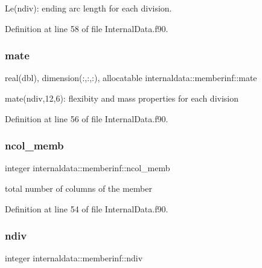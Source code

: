 Le(ndiv)\+: ending arc length for each division. 



Definition at line 58 of file Internal\+Data.\+f90.

\mbox{\label{structinternaldata_1_1memberinf_a992b8e0a6f7e01d33329d4cf9ee5737f}} 
\subsubsection{\texorpdfstring{mate}{mate}}
{\footnotesize\ttfamily real(dbl), dimension(\+:,\+:,\+:), allocatable internaldata\+::memberinf\+::mate}



mate(ndiv,12,6)\+: flexibity and mass properties for each division 



Definition at line 56 of file Internal\+Data.\+f90.

\mbox{\label{structinternaldata_1_1memberinf_abff7a37a6411bc3bd96131bfccf98e91}} 
\subsubsection{\texorpdfstring{ncol\+\_\+memb}{ncol\_memb}}
{\footnotesize\ttfamily integer internaldata\+::memberinf\+::ncol\+\_\+memb}



total number of columns of the member 



Definition at line 54 of file Internal\+Data.\+f90.

\mbox{\label{structinternaldata_1_1memberinf_a2af474d1d2e3a33ab9b4c932575a2294}} 
\subsubsection{\texorpdfstring{ndiv}{ndiv}}
{\footnotesize\ttfamily integer internaldata\+::memberinf\+::ndiv}



